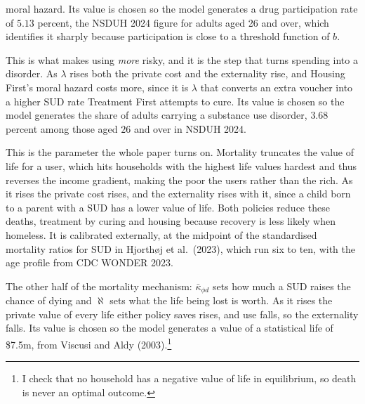 \documentclass[10pt]{article}
\begin{document}
\begin{description}
moral hazard. Its value is chosen so the
model generates a drug participation rate of $5.13$ percent, the NSDUH 2024 figure
for adults aged 26 and over, which identifies it sharply because participation is
close to a threshold function of $b$.
\item[$\lambda$, the hazard per unit used.] This is what makes using \emph{more}
risky, and it is the step that turns spending
into a disorder. As $\lambda$ rises both the private cost and the
externality rise, and Housing First's moral hazard costs more, since it is
$\lambda$ that converts an extra voucher into a higher SUD rate Treatment First
attempts to cure. Its value is chosen so the model generates the share
of adults carrying a substance use disorder, $3.68$ percent among those aged $26$
and over in NSDUH 2024.
\item[$\bar\kappa_{\phi d}$, increased mortality with a SUD.] This is the parameter the whole
paper turns on. Mortality truncates the value of life for a user, which
hits households with the highest life values hardest and thus reverses the income
gradient, making the poor the users rather than the rich. As it rises
the private cost rises, and the externality rises
with it, since a child born to a parent with a SUD has a lower value of life.
Both policies reduce these deaths, treatment by curing and housing because recovery
is less likely when homeless. It is calibrated externally, at the midpoint of the
standardised mortality ratios for SUD in Hjorth\o j et al.\ (2023), which run six to
ten, with the age profile from CDC WONDER 2023.
\item[$\aleph$, the flow value of being alive.] The other half of the mortality
mechanism: $\bar\kappa_{\phi d}$ sets how much a SUD raises the chance of dying and
$\aleph$ sets what the life being lost is worth. As it rises the private
value of every life either policy saves rises, and use falls, so the externality
falls. Its
value is chosen so the model generates a value of a statistical life of \$7.5m,
from Viscusi and Aldy (2003).\footnote{I check that no household has a
negative value of life in equilibrium, so death is never an optimal outcome.}
\end{description}
\end{document}
